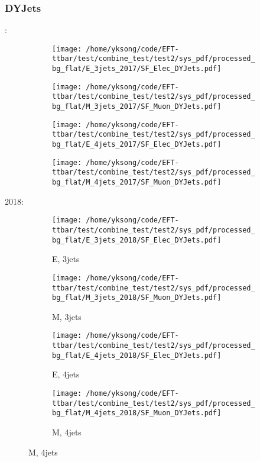 \documentclass{beamer}
\begin{document}
\begin{frame}
\frametitle{DYJets}
\fontsize{5}{1}:
\begin{figure}
\centering
\begin{subfigure}[b]{0.24\textwidth}
\texttt{[image: /home/yksong/code/EFT-ttbar/test/combine\_test/test2/sys\_pdf/processed\_bg\_flat/E\_3jets\_2017/SF\_Elec\_DYJets.pdf]}
\end{subfigure}
\begin{subfigure}[b]{0.24\textwidth}
\texttt{[image: /home/yksong/code/EFT-ttbar/test/combine\_test/test2/sys\_pdf/processed\_bg\_flat/M\_3jets\_2017/SF\_Muon\_DYJets.pdf]}
\end{subfigure}
\begin{subfigure}[b]{0.24\textwidth}
\texttt{[image: /home/yksong/code/EFT-ttbar/test/combine\_test/test2/sys\_pdf/processed\_bg\_flat/E\_4jets\_2017/SF\_Elec\_DYJets.pdf]}
\end{subfigure}
\begin{subfigure}[b]{0.24\textwidth}
\texttt{[image: /home/yksong/code/EFT-ttbar/test/combine\_test/test2/sys\_pdf/processed\_bg\_flat/M\_4jets\_2017/SF\_Muon\_DYJets.pdf]}
\end{subfigure}
\end{figure}
2018:
\begin{figure}
\centering
\begin{subfigure}[b]{0.24\textwidth}
\texttt{[image: /home/yksong/code/EFT-ttbar/test/combine\_test/test2/sys\_pdf/processed\_bg\_flat/E\_3jets\_2018/SF\_Elec\_DYJets.pdf]}
\captionsetup{font=tiny}
\caption{E, 3jets}
\end{subfigure}
\begin{subfigure}[b]{0.24\textwidth}
\texttt{[image: /home/yksong/code/EFT-ttbar/test/combine\_test/test2/sys\_pdf/processed\_bg\_flat/M\_3jets\_2018/SF\_Muon\_DYJets.pdf]}
\captionsetup{font=tiny}
\caption{M, 3jets}
\end{subfigure}
\begin{subfigure}[b]{0.24\textwidth}
\texttt{[image: /home/yksong/code/EFT-ttbar/test/combine\_test/test2/sys\_pdf/processed\_bg\_flat/E\_4jets\_2018/SF\_Elec\_DYJets.pdf]}
\captionsetup{font=tiny}
\caption{E, 4jets}
\end{subfigure}
\begin{subfigure}[b]{0.24\textwidth}
\texttt{[image: /home/yksong/code/EFT-ttbar/test/combine\_test/test2/sys\_pdf/processed\_bg\_flat/M\_4jets\_2018/SF\_Muon\_DYJets.pdf]}
\captionsetup{font=tiny}
\caption{M, 4jets}
\end{subfigure}
\end{figure}
\end{frame}
\end{document}
